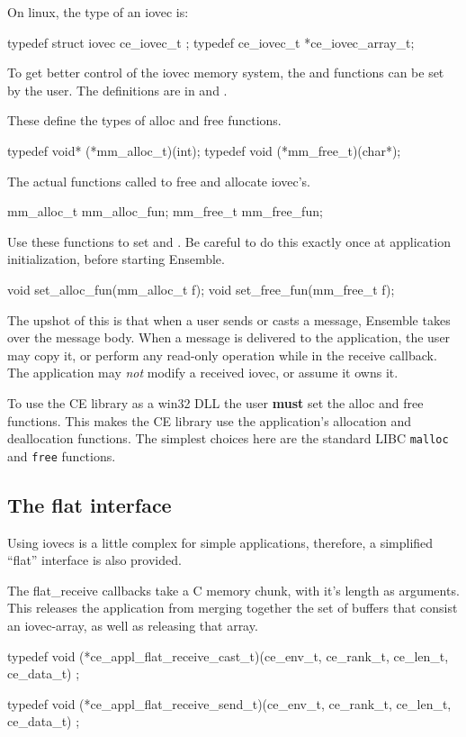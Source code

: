 On linux, the type of an iovec is:
\begin{codebox}
typedef struct iovec ce_iovec_t ;
typedef ce_iovec_t *ce_iovec_array_t;
\end{codebox}

To get better control of the iovec memory system, the  and 
 functions can be set by the user. The definitions are in
 and  .

These define the types of alloc and free functions.
\begin{codebox}
typedef void* (*mm_alloc_t)(int);
typedef void  (*mm_free_t)(char*);
\end{codebox}

The actual functions called to free and allocate iovec's.
\begin{codebox}
mm_alloc_t mm_alloc_fun;
mm_free_t mm_free_fun;
\end{codebox}

Use these functions to set  and . Be careful to
do this exactly once at application initialization, before
starting Ensemble.
\begin{codebox}
void set_alloc_fun(mm_alloc_t f);
void set_free_fun(mm_free_t f);
\end{codebox}

The upshot of this is that when a user sends or casts a message,
Ensemble takes over the message body. When a message is
delivered to the application, the user may copy it, or perform any
read-only operation while in the receive callback. The application may
{\it not} modify a received iovec, or assume it owns it.

To use the CE library as a win32 DLL the user {\bf must} set the alloc
and free functions. This makes the CE library use the application's
allocation and deallocation functions. The simplest choices here are
the standard LIBC {\tt malloc} and {\tt free} functions. 

\subsection{The flat interface}
Using iovecs is a little complex for simple applications,
therefore, a simplified ``flat'' interface is also provided.

The flat\_receive callbacks take a C memory chunk, with it's length as
arguments. This releases the application from merging together the
set of buffers that consist an iovec-array, as well as releasing that
array.
\begin{codebox}
typedef void (*ce_appl_flat_receive_cast_t)(ce_env_t, ce_rank_t, ce_len_t, ce_data_t) ;

typedef void (*ce_appl_flat_receive_send_t)(ce_env_t, ce_rank_t, ce_len_t, ce_data_t) ;
\end{codebox}


